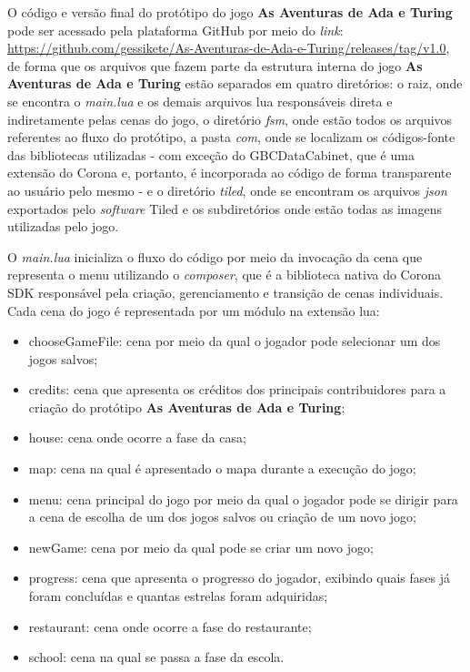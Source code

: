 O código e versão final do protótipo do jogo \textbf{As Aventuras de Ada e Turing} pode ser acessado pela plataforma GitHub por meio do \textit{link}: \url{https://github.com/gessikete/As-Aventuras-de-Ada-e-Turing/releases/tag/v1.0}, de forma que os arquivos que fazem parte da estrutura interna do jogo \textbf{As Aventuras de Ada e Turing} estão separados em quatro diretórios: o raiz, onde se encontra o \textit{main.lua} e os demais arquivos lua responsáveis direta e indiretamente pelas cenas do jogo, o diretório \textit{fsm}, onde estão todos os arquivos referentes ao fluxo do protótipo, a pasta \textit{com}, onde se localizam os códigos-fonte das bibliotecas utilizadas - com exceção do GBCDataCabinet, que é uma extensão do Corona e, portanto, é incorporada ao código de forma transparente ao usuário pelo mesmo - e o diretório \textit{tiled}, onde se encontram os arquivos \textit{json} exportados pelo \textit{software} Tiled e os subdiretórios onde estão todas as imagens utilizadas pelo jogo.

O \textit{main.lua} inicializa o fluxo do código por meio da invocação da cena que representa o menu  utilizando o \textit{composer}, que é a biblioteca nativa do Corona SDK responsável pela criação, gerenciamento e transição de cenas individuais. Cada cena do jogo é representada por um módulo na extensão lua:
\begin{itemize}
\item chooseGameFile: cena por meio da qual o jogador pode selecionar um dos jogos salvos;
\item credits: cena que apresenta os créditos dos principais contribuidores para a criação do protótipo \textbf{As Aventuras de Ada e Turing};
\item house: cena onde ocorre a fase da casa;
\item map: cena na qual é apresentado o mapa durante a execução do jogo;
\item menu: cena principal do jogo por meio da qual o jogador pode se dirigir para a cena de escolha de um dos jogos salvos ou criação de um novo jogo;
\item newGame: cena por meio da qual pode se criar um novo jogo;
\item progress: cena que apresenta o progresso do jogador, exibindo quais fases já foram concluídas e quantas estrelas foram adquiridas;
\item restaurant: cena onde ocorre a fase do restaurante;
\item school: cena na qual se passa a fase da escola.
\end{itemize}

